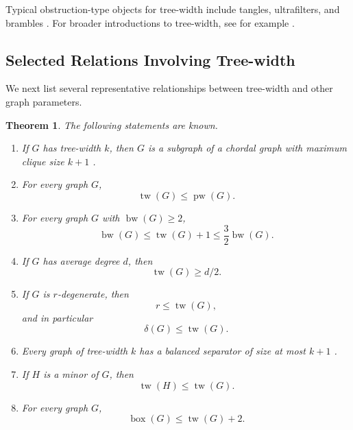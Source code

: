 \documentclass[10pt]{book}
\newtheorem{theorem}{Theorem}[section]
\theoremstyle{definition}
\begin{document}
Typical obstruction-type objects for tree-width include tangles, ultrafilters, and brambles
\cite{47,fujitaultrafilter,239,240,241,242}.  
For broader introductions to tree-width, see for example
\cite{bienstock1989graph,kloks1994treewidth,bodlaender1998partial,bronner2006introduction}.

\subsection{Selected Relations Involving Tree-width}

We next list several representative relationships between tree-width and other graph parameters.

\begin{theorem}
The following statements are known.
\begin{enumerate}
    \item If \(G\) has tree-width \(k\), then \(G\) is a subgraph of a chordal graph with maximum clique size \(k+1\) \cite{bodlaender1998partial}.

    \item For every graph \(G\),
    \[
    \operatorname{tw}(G)\leq \operatorname{pw}(G).
    \]

    \item For every graph \(G\) with \(\operatorname{bw}(G)\geq 2\),
    \[
    \operatorname{bw}(G)\leq \operatorname{tw}(G)+1
    \leq \frac{3}{2}\operatorname{bw}(G).
    \]
    \cite{213}

    \item If \(G\) has average degree \(d\), then
    \[
    \operatorname{tw}(G)\geq d/2.
    \]
    \cite{chandran2005girth}

    \item If \(G\) is \(r\)-degenerate, then
    \[
    r\leq \operatorname{tw}(G),
    \]
    and in particular
    \[
    \delta(G)\leq \operatorname{tw}(G).
    \]
    \cite{chandran2005girth,402}

    \item Every graph of tree-width \(k\) has a balanced separator of size at most \(k+1\)
    \cite{364,blasius2016hyperbolic}.

    \item If \(H\) is a minor of \(G\), then
    \[
    \operatorname{tw}(H)\leq \operatorname{tw}(G).
    \]
    \cite{dallard2024treewidth}

    \item For every graph \(G\),
    \[
    \operatorname{box}(G)\leq \operatorname{tw}(G)+2.
    \]
    \cite{347}


\end{enumerate}
\end{theorem}
\end{document}
